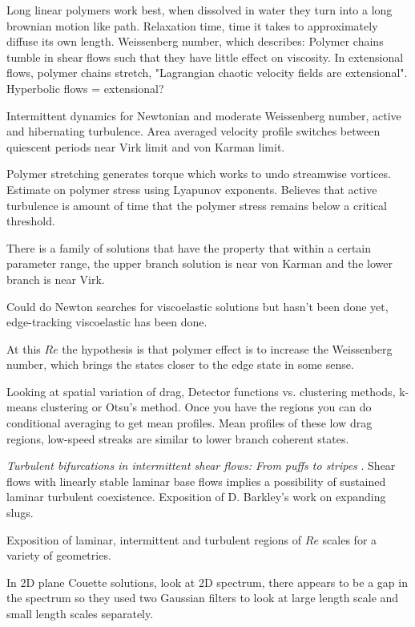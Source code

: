 \begin{description}
{\begin{description}
Long linear polymers work best, when dissolved in water they turn into a long brownian motion like path.
Relaxation time, time it takes to approximately diffuse its own length.
Weissenberg number, which describes:
Polymer chains tumble in shear flows such that they have little effect on viscosity. In extensional flows,
polymer chains stretch, "Lagrangian chaotic velocity fields are extensional". Hyperbolic flows = extensional?

Intermittent dynamics for Newtonian and moderate Weissenberg number, active and hibernating turbulence.
Area averaged velocity profile switches between quiescent periods near Virk limit and von Karman limit.

Polymer stretching generates torque which works to undo streamwise vortices.
Estimate on polymer stress using Lyapunov exponents. Believes that active turbulence is amount of
time that the polymer stress remains below a critical threshold.

There is a family of solutions that have the property that within a certain parameter range, the
upper branch solution is near von Karman and the lower branch is near Virk.

Could do Newton searches for viscoelastic solutions but hasn't been done
yet, edge-tracking viscoelastic has been done.

At this $Re$ the hypothesis is that polymer effect is to increase the Weissenberg number, which brings
the states closer to the edge state in some sense.

Looking at spatial variation of drag, Detector functions vs. clustering methods, k-means clustering or
Otsu's method. Once you have the regions you can do conditional averaging to get mean profiles. Mean
profiles of these low drag regions, low-speed streaks are similar to lower branch coherent states.

\item[Y. Duguet]
\textit{Turbulent bifurcations in intermittent shear flows: From puffs to stripes}
.
Shear flows with linearly stable laminar base flows implies a possibility of sustained
laminar turbulent coexistence. Exposition of D. Barkley's work on expanding slugs.

Exposition of laminar, intermittent and turbulent regions of $Re$ scales for a variety
of geometries.

In 2D plane Couette solutions, look at 2D spectrum, there appears to be a gap in the spectrum
so they used two Gaussian filters to look at large length scale and small length scales separately.


\end{description}}
\end{description}
